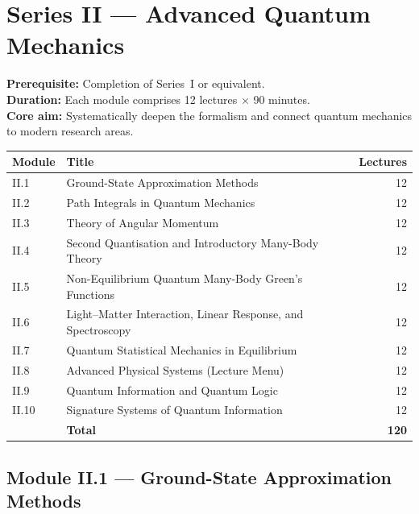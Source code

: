 \documentclass[11pt,a4paper]{article}
\begin{document}
\section{Series II --- Advanced Quantum Mechanics}
\label{sec:seriesII}

\begin{tcolorbox}[seriesbox, title={Series~II Overview}]
\textbf{Prerequisite:} Completion of Series~I or equivalent.\\
\textbf{Duration:} Each module comprises 12 lectures $\times$ 90 minutes.\\
\textbf{Core aim:} Systematically deepen the formalism and connect quantum
mechanics to modern research areas.\\[4pt]
\begin{tabular}{llr}
\toprule
\textbf{Module} & \textbf{Title} & \textbf{Lectures}\\
\midrule
II.1 & Ground-State Approximation Methods & 12\\
II.2 & Path Integrals in Quantum Mechanics & 12\\
II.3 & Theory of Angular Momentum & 12\\
II.4 & Second Quantisation and Introductory Many-Body Theory & 12\\
II.5 & Non-Equilibrium Quantum Many-Body Green's Functions & 12\\
II.6 & Light--Matter Interaction, Linear Response, and Spectroscopy & 12\\
II.7 & Quantum Statistical Mechanics in Equilibrium & 12\\
II.8 & Advanced Physical Systems (Lecture Menu) & 12\\
II.9 & Quantum Information and Quantum Logic & 12\\
II.10 & Signature Systems of Quantum Information & 12\\
\midrule
 & \textbf{Total} & \textbf{120}\\
\bottomrule
\end{tabular}
\end{tcolorbox}

\subsection{Module II.1 --- Ground-State Approximation Methods}
\label{sec:mod-II1}
\end{document}

